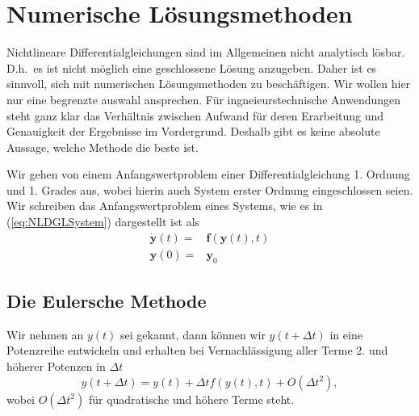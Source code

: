\chapter{Numerische Lösungsmethoden}
Nichtlineare Differentialgleichungen sind im Allgemeinen nicht analytisch
lösbar. D.h.\ es ist nicht möglich eine geschlossene Lösung anzugeben. Daher
ist es sinnvoll, sich mit numerischen Lösungsmethoden zu beschäftigen.  Wir
wollen hier nur eine begrenzte auswahl ansprechen. Für ingneieurstechnische
Anwendungen steht ganz klar das Verhältnis zwischen Aufwand für deren
Erarbeitung und Genauigkeit der Ergebnisse im Vordergrund. Deshalb gibt es
keine absolute Aussage, welche Methode die beste ist.

Wir gehen von einem Anfangswertproblem einer Differentialgleichung 1. Ordnung
und 1. Grades aus, wobei hierin auch System erster Ordnung eingeschlossen
seien. Wir schreiben das Anfangswertproblem eines Systems, wie es in
(\ref{eq:NLDGLSystem}) dargestellt ist als
\begin{align}
  \dot{\mathbf{y}}(t) =& \mathbf{f}(\mathbf{y}(t),t) \label{eq:yNLSystem}\\
  \mathbf{y}(0)       =& \mathbf{y}_{0}\nonumber
\end{align}
\section{Die Eulersche Methode}
Wir nehmen an $y(t)$ sei gekannt, dann können wir $y(t+\Delta t)$ in eine
Potenzreihe entwickeln und erhalten bei Vernachlässigung aller Terme 2. und
höherer Potenzen in $\Delta t$ 
\begin{equation}
  y(t+\Delta t) = y(t)+\Delta t f(y(t),t)+O(\Delta t^2),
  \label{eq:Euler}
\end{equation}
wobei $O(\Delta t^2)$ für quadratische und höhere Terme steht.

